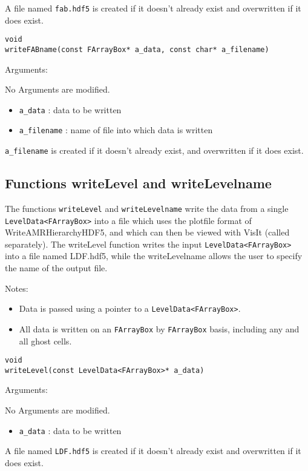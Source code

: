 A file named \verb|fab.hdf5| is created if it doesn't already exist and
overwritten if it does exist. 


\begin{verbatim}
void
writeFABname(const FArrayBox* a_data, const char* a_filename)
\end{verbatim}  

Arguments:

No Arguments are modified.
\begin{itemize}
\item \verb|a_data| : data to be written
\item \verb|a_filename| : name of file into which data is written
\end{itemize}

\verb+a_filename+ is created if it doesn't already exist, and overwritten
if it does exist.  



\subsection{Functions writeLevel and writeLevelname}
The functions \protect\verb|writeLevel| and \protect\verb|writeLevelname|
write the data from a single {\tt LevelData<FArrayBox>} into a file which
uses the plotfile format of WriteAMRHierarchyHDF5, and which can
then be viewed with VisIt (called separately). The writeLevel
function writes the input {\tt LevelData<FArrayBox> } into a file named
LDF.hdf5, while the writeLevelname allows the user to specify the name
of the output file.  

Notes:
\begin{itemize}
\item Data is passed using a pointer to a {\tt LevelData<FArrayBox>}. 
\item All data is written on an {\tt FArrayBox} by {\tt FArrayBox}
basis, including any and all ghost cells.
\end{itemize}

\begin{verbatim}
void
writeLevel(const LevelData<FArrayBox>* a_data)
\end{verbatim}  

Arguments:

No Arguments are modified.
\begin{itemize}
\item \verb|a_data| : data to be written
\end{itemize}

A file named \verb|LDF.hdf5| is created if it doesn't already exist and
overwritten if it does exist. 



